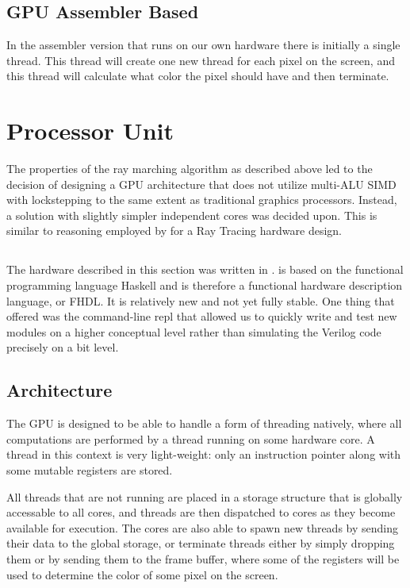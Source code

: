 		\subsection{GPU Assembler Based}

			In the assembler version that runs on our own hardware there is
			initially a single thread. This thread will create one new thread
			for each pixel on the screen, and this thread will calculate what 
			color the pixel should have and then terminate. 

	\section{Processor Unit} \label{implproc}

		The properties of the ray marching algorithm as described above led to
		the decision of designing a GPU architecture that does not utilize
		multi-ALU SIMD with lockstepping to the same extent as traditional
		graphics processors. Instead, a solution with slightly simpler
		independent cores was decided upon. This is similar to reasoning
		employed by \cite{Woop2005} for a Ray Tracing hardware design.

		\subsection{\clash}

			The hardware described in this section was written in \clash. \clash is
			based on the functional programming language Haskell and is therefore a
			functional hardware description language, or FHDL. It is relatively new
			and not yet fully stable. One thing that \clash offered was the
			command-line repl that allowed us to quickly write and test new modules
			on a higher conceptual level rather than simulating the Verilog code
			precisely on a bit level.

		\subsection{Architecture}

			The GPU is designed to be able to handle a form of threading
			natively, where all computations are performed by a thread running
			on some hardware core. A thread in this context is very
			light-weight: only an instruction pointer along with some mutable
			registers are stored.

			All threads that are not running are placed in a storage structure
			that is globally accessable to all cores, and threads are then 
			dispatched to cores as they become available for execution. The 
			cores are also able to spawn new threads by sending their data to
			the global storage, or terminate threads either by simply dropping 
			them or by sending them to the frame buffer, where some of the 
			registers will be used to determine the color of some pixel on the
			screen.

